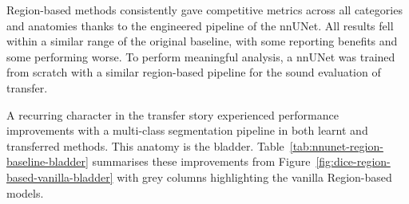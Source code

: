 \documentclass[11pt,twoside]{report}
\begin{document}

Region-based methods consistently gave competitive metrics across all categories and anatomies thanks to the engineered pipeline of the nnUNet. All results fell within a similar range of the original baseline, with some reporting benefits and some performing worse. To perform meaningful analysis, a nnUNet was trained from scratch with a similar region-based pipeline for the sound evaluation of transfer.

A recurring character in the transfer story experienced performance improvements with a multi-class segmentation pipeline in both learnt and transferred methods. This anatomy is the bladder. Table~\ref{tab:nnunet-region-baseline-bladder} summarises these improvements from Figure~\ref{fig:dice-region-based-vanilla-bladder} with grey columns highlighting the vanilla Region-based models.
\end{document}
